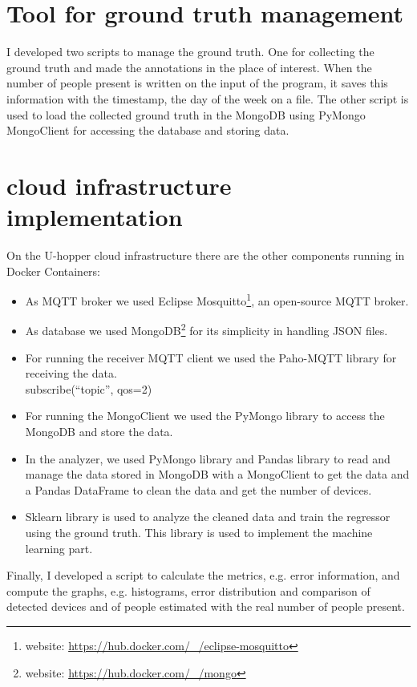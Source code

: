 


\section{Tool for ground truth management}
\label{sec:toolgt}
\vspace{0.2 cm} 

I developed two scripts to manage the ground truth. One for collecting the ground truth and made the annotations in the place of interest. When the number of people present is written on the input of the program, it saves this information with the timestamp, the day of the week on a file.
The other script is used to load the collected ground truth in the MongoDB using PyMongo MongoClient for accessing the database and storing data.


\section{cloud infrastructure implementation}
\label{sec:cloudinfrastructure}
\vspace{0.2 cm} 

On the U-hopper cloud infrastructure there are the other components running in Docker Containers:
\begin{itemize}
  \item As MQTT broker we used Eclipse Mosquitto\footnote{ website: \url{https://hub.docker.com/_/eclipse-mosquitto} }, an open-source MQTT broker.
  \item As database we used MongoDB\footnote{ website: \url{https://hub.docker.com/_/mongo} } for its simplicity in handling JSON files.
  \item For running the receiver MQTT client we used the Paho-MQTT library for receiving the data.\\subscribe(``topic'', qos=2)
  \item For running the MongoClient we used the PyMongo library to access the MongoDB and store the data.
  \item In the analyzer, we used PyMongo library and Pandas library to read and manage the data stored in MongoDB with a MongoClient to get the data and a Pandas DataFrame to clean the data and get the number of devices.
  \item Sklearn library is used to analyze the cleaned data and train the regressor using the ground truth. This library is used to implement the machine learning part.
\end{itemize}

Finally, I developed a script to calculate the metrics, e.g. error information, and compute the graphs, e.g. histograms, error distribution and comparison of detected devices and of people estimated with the real number of people present.

